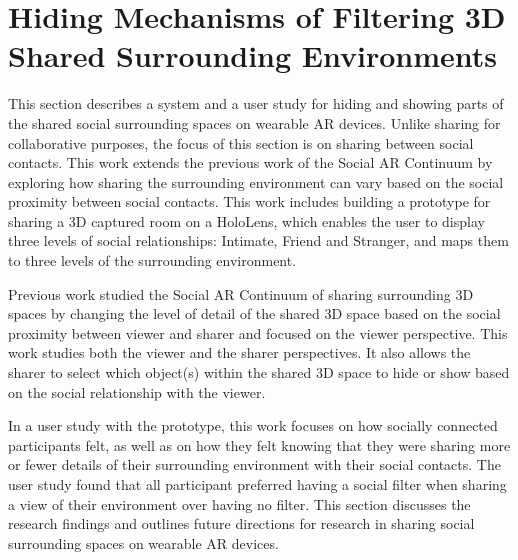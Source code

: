 \pagebreak
\section{Hiding Mechanisms of Filtering 3D Shared Surrounding Environments}
\label{sec:surrounding:hiding}

This section describes a system and a user study for hiding and showing parts of the shared social surrounding spaces on wearable AR devices. Unlike sharing for collaborative purposes, the focus of this section is on sharing between social contacts. This work extends the previous work of the Social AR Continuum by exploring how sharing the surrounding environment can vary based on the social proximity between social contacts. This work includes building a prototype for sharing a 3D captured room on a HoloLens, which enables the user to display three levels of social relationships: Intimate, Friend and Stranger, and maps them to three levels of the surrounding environment.

Previous work studied the Social AR Continuum of sharing surrounding 3D spaces by changing the level of detail of the shared 3D space based on the social proximity between viewer and sharer and focused on the viewer perspective. This work studies both the viewer and the sharer perspectives. It also allows the sharer to select which object(s) within the shared 3D space to hide or show based on the social relationship with the viewer. 

In a user study with the prototype, this work focuses on how socially connected participants felt, as well as on how they felt knowing that they were sharing more or fewer details of their surrounding environment with their social contacts. The user study found that all participant preferred having a social filter when sharing a view of their environment over having no filter. This section discusses the research findings and outlines future directions for research in sharing social surrounding spaces on wearable AR devices. 




